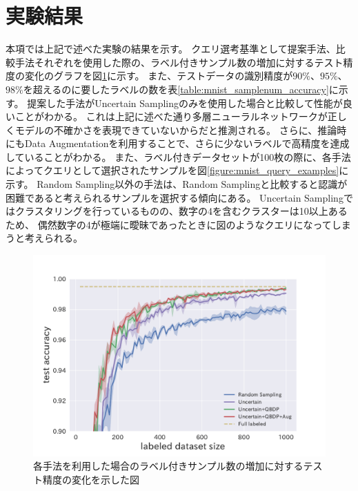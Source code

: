 \section{実験結果}
本項では上記で述べた実験の結果を示す。
クエリ選考基準として提案手法、比較手法それぞれを使用した際の、ラベル付きサンプル数の増加に対するテスト精度の変化のグラフを図\ref{fig:mnist_acc_graph}に示す。
また、テストデータの識別精度が$90\%$、$95\%$、$98\%$を超えるのに要したラベルの数を表\ref{table:mnist_samplenum_accuracy}に示す。
提案した手法がUncertain Samplingのみを使用した場合と比較して性能が良いことがわかる。
これは上記に述べた通り多層ニューラルネットワークが正しくモデルの不確かさを表現できていないからだと推測される。
さらに、推論時にもData Augmentationを利用することで、さらに少ないラベルで高精度を達成していることがわかる。
また、ラベル付きデータセットが100枚の際に、各手法によってクエリとして選択されたサンプルを図\ref{figure:mnist_query_examples}に示す。
Random Sampling以外の手法は、Random Samplingと比較すると認識が困難であると考えられるサンプルを選択する傾向にある。
Uncertain Samplingではクラスタリングを行っているものの、数字の4を含むクラスターは10以上あるため、
偶然数字の4が極端に曖昧であったときに図のようなクエリになってしまうと考えられる。


\begin{figure}[h]
     \begin{center}
      \includegraphics[width=12cm]{figures/mnist_acc_graph.pdf}
     \end{center}
    \caption{\label{fig:mnist_acc_graph}各手法を利用した場合のラベル付きサンプル数の増加に対するテスト精度の変化を示した図}
\end{figure}

